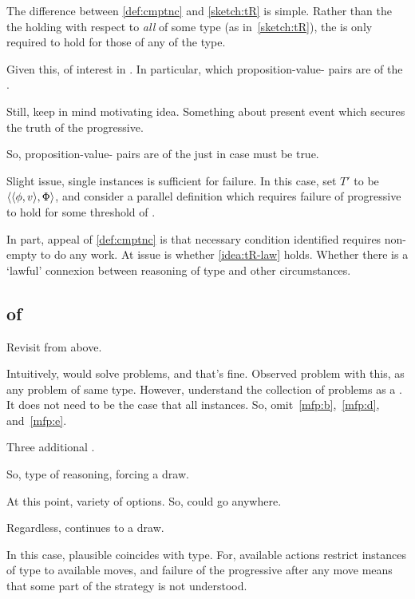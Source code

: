 \begin{note}
  The difference between \autoref{def:cmptnc} and \autoref{sketch:tR} is simple.
  Rather than the the \itc{} holding with respect to \emph{all} \tI{} of some type (as in~\autoref{sketch:tR}), the \itc{} is only required to hold for those  of any \emph{} of the type.

  Given this, of interest in .
  In particular, which proposition-value-\poP{} pairs are  of the .

  Still, keep in mind motivating idea.
  Something about present event which secures the truth of the progressive.

  So, proposition-value-\poP{} pairs are  of the  just in case \itc{} must be true.
\end{note}

\begin{note}
  Slight issue, single instances is sufficient for failure.
  In this case, set \(T'\) to be \(\langle \langle \phi, v \rangle, \Phi \rangle\), and consider a parallel definition which requires failure of progressive to hold for some threshold of \tI{}.

  In part, appeal of \autoref{def:cmptnc} is that necessary condition identified requires non-empty \tRep{} to do any work.
  At issue is whether \autoref{idea:tR-law} holds.
  Whether there is a `lawful' connexion between reasoning of type and other circumstances.
\end{note}

\subsection{ of \tR{}}
\label{sec:illu3}

\begin{note}
  Revisit  from above.

  Intuitively, would solve problems, and that's fine.
  Observed problem with this, as any problem of same type.
  However, understand the collection of problems as a .
  It does not need to be the case that all instances.
  So, omit~\ref{mfp:b},~\ref{mfp:d}, and~\ref{mfp:e}.
\end{note}

\begin{note}
  Three additional .
\end{note}

\begin{note}
  \begin{illustration}
    So, type of reasoning, forcing a draw.

    At this point, variety of options.
    So, could go anywhere.

    Regardless, continues to a draw.
  \end{illustration}

  In this case, \rotor{} plausible coincides with type.
  For, available actions restrict instances of type to available moves, and failure of the progressive after any move means that some part of the strategy is not understood.
\end{note}

